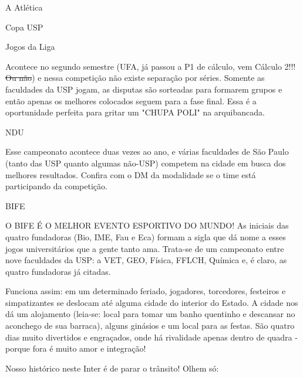 \begin{secao}{A Atlética}
\begin{subsecao}{Copa USP}
\end{subsecao}
\begin{subsecao}{Jogos da Liga}

Acontece no segundo semestre (UFA, já passou a P1 de cálculo, vem Cálculo 2!!!
\sout{Ou não}) e nessa competição não existe separação por séries. Somente as
faculdades da USP jogam, as disputas são sorteadas para formarem grupos e
então apenas os melhores colocados seguem para a fase final. Essa é a
oportunidade perfeita para gritar um "CHUPA POLI" na arquibancada.

\end{subsecao}
\begin{subsecao}{NDU}

Esse campeonato acontece duas vezes ao ano, e várias faculdades de São Paulo
(tanto das USP quanto algumas não-USP) competem na cidade em busca dos melhores
resultados. Confira com o DM da modalidade se o time está participando da
competição.

\end{subsecao}
\begin{subsecao}{BIFE}

O BIFE É O MELHOR EVENTO ESPORTIVO DO MUNDO! As iniciais das quatro fundadoras
(Bio, IME, Fau e Eca) formam a sigla que dá nome a esses jogos universitários
que a gente tanto ama. Trata-se de um campeonato entre nove faculdades da USP:
a VET, GEO, Física, FFLCH, Química e, é claro, as quatro fundadoras já citadas.

Funciona assim: em um determinado feriado, jogadores, torcedores, festeiros e
simpatizantes se deslocam até alguma cidade do interior do Estado. A cidade nos
dá um alojamento (leia-se: local para tomar um banho quentinho e descansar no
aconchego de sua barraca), alguns ginásios e um local para as festas. São
quatro dias muito divertidos e engraçados, onde há rivalidade apenas dentro de
quadra - porque fora é muito amor e integração!

Nosso histórico neste Inter é de parar o trânsito! Olhem só:


\end{subsecao}
\end{secao}

